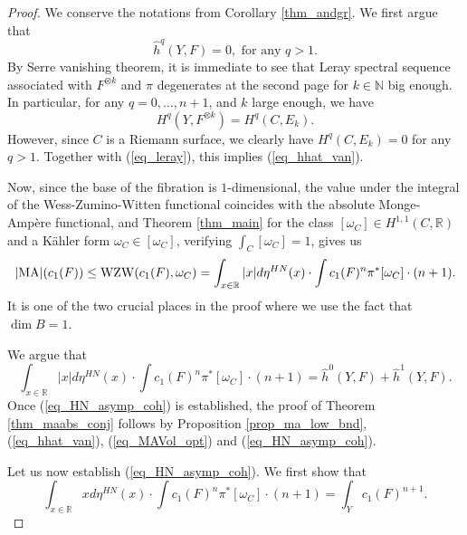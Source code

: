 \documentclass[12pt]{article}
\numberwithin{equation}{section}
\theoremstyle{theorem}
\theoremstyle{definition}
\theoremstyle{remark}
\newcommand{\real}{\mathbb{R}}
\newcommand{\nat}{\mathbb{N}}
\begin{document}
	\begin{proof}
		We conserve the notations from Corollary \ref{thm_andgr}.
		We first argue that
		\begin{equation}\label{eq_hhat_van}
			\hat{h}^q(Y, F) = 0, \text{ for any } q > 1.
		\end{equation}
		By Serre vanishing theorem, it is immediate to see that Leray spectral sequence associated with $F^{\otimes k}$ and $\pi$ degenerates at the second page for $k \in \nat$ big enough.
		In particular, for any $q = 0, \ldots, n + 1$, and $k$ large enough, we have
		\begin{equation}\label{eq_leray}
			H^q(Y, F^{\otimes k}) =  H^q(C, E_k). 
		\end{equation}		 
		However, since $C$ is a Riemann surface, we clearly have $H^q(C, E_k) = 0$ for any $q > 1$. 
		Together with (\ref{eq_leray}), this implies (\ref{eq_hhat_van}).
		\par 
		Now, since the base of the fibration is $1$-dimensional, the value under the integral of the Wess-Zumino-Witten functional coincides with the absolute Monge-Ampère functional, and Theorem \ref{thm_main} for the class $[\omega_C] \in H^{1, 1}(C, \real)$ and a Kähler form $\omega_C \in [\omega_C]$, verifying $\int_C [\omega_C] = 1$, gives us
		\begin{equation}\label{eq_MAVol_opt}
			|{\rm{MA}}|(c_1(F))
			\leq
			{\rm{WZW}}(c_1(F), \omega_C)
			=
			\int_{x \in \real} |x| d \eta^{HN}(x)
			\cdot
			\int c_1(F)^n \pi^* [\omega_C]
			\cdot
			(n + 1).
		\end{equation}
		It is one of the two crucial places in the proof where we use the fact that $\dim B = 1$.
		\par 
		We argue that 
		\begin{equation}\label{eq_HN_asymp_coh}
			\int_{x \in \real} |x| d \eta^{HN}(x)
			\cdot
			\int c_1(F)^n \pi^* [\omega_C]
			\cdot
			(n + 1)
			=
			\hat{h}^0(Y, F) + \hat{h}^1(Y, F).
		\end{equation}
		Once (\ref{eq_HN_asymp_coh}) is established, the proof of Theorem \ref{thm_maabs_conj} follows by Proposition \ref{prop_ma_low_bnd}, (\ref{eq_hhat_van}), (\ref{eq_MAVol_opt}) and (\ref{eq_HN_asymp_coh}).
		\par 
		Let us now establish (\ref{eq_HN_asymp_coh}).
		We first show that 
		\begin{equation}\label{eq_x_HN}
			\int_{x \in \real} x d \eta^{HN}(x) \cdot
			\int c_1(F)^n \pi^* [\omega_C]
			\cdot
			(n + 1)
			=
			\int_Y c_1(F)^{n + 1}.
		\end{equation}

\end{proof}
\end{document}
